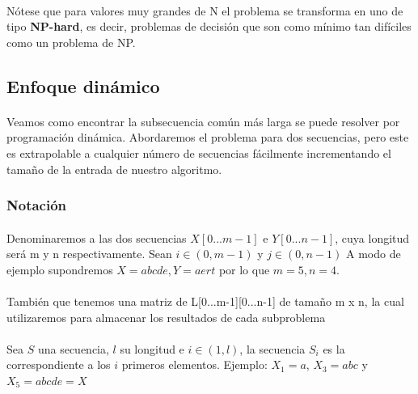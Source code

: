 \documentclass{article}
\begin{document}
		\paragraph{}
		Nótese que para valores muy grandes de N el problema se transforma en uno de tipo \textbf{NP-hard}, es decir, problemas de decisión que son como mínimo tan difíciles como un problema de NP.

	\subsection{Enfoque dinámico}

		\paragraph{}
		Veamos como encontrar la subsecuencia común más larga se puede resolver por programación dinámica. Abordaremos el problema para dos secuencias, pero este es extrapolable a cualquier número de secuencias fácilmente incrementando el tamaño de la entrada de nuestro algoritmo.

		\subsubsection{Notación}

			\paragraph{}
			Denominaremos a las dos secuencias $X[0...m-1]$ e $Y[0...n-1]$, cuya longitud será m y n respectivamente.  Sean $i \in (0, m-1)$ y $j \in (0, n-1)$
			\newline{}
			A modo de ejemplo supondremos $X = abcde, Y = aert$ por lo que $m = 5, n = 4$.
			
			\paragraph{}
			También que tenemos una matriz de L[0...m-1][0...n-1] de tamaño m x n, la cual  utilizaremos para almacenar los resultados de cada subproblema
			
			\paragraph{}
			Sea $S$ una secuencia, $l$ su longitud  e $i \in (1, l)$, la secuencia $S_{i}$ es la correspondiente a los $i$ primeros elementos. 
			\newline{}
			Ejemplo: $X_{1} = a$, $X_{3} = abc$ y $X_{5} = abcde = X$
			
\end{document}

